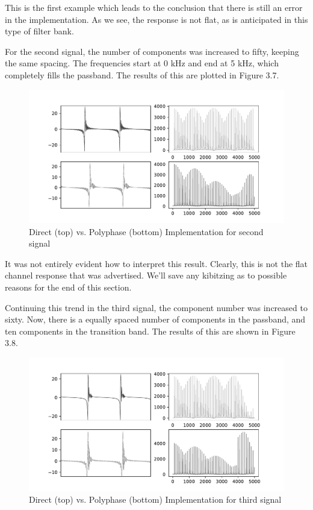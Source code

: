 \documentclass{report}
\begin{document}
This is the first example which leads to the conclusion that there is still an error in the implementation.  As we see, the response is not flat, as is anticipated in this type of filter bank.  

For the second signal, the number of components was increased to fifty, keeping the same spacing.  The frequencies start at 0 kHz and end at 5 kHz, which completely fills the passband.  The results of this are plotted in Figure 3.7.

\begin{figure}[ht]
\includegraphics[scale=.55]{Figure_7.pdf}
\caption{Direct (top) vs. Polyphase (bottom) Implementation for second signal}
\end{figure} 

It was not entirely evident how to interpret this result.  Clearly, this is not the flat channel response that was advertised.  We'll save any kibitzing as to possible reasons for the end of this section.

Continuing this trend in the third signal, the component number was increased to sixty.  Now, there is a equally spaced number of components in the passband, and ten components in the transition band. The results of this are shown in Figure 3.8.

\begin{figure}[!ht]
\includegraphics[scale=.55]{Figure_8.pdf}
\caption{Direct (top) vs. Polyphase (bottom) Implementation for third signal}
\end{figure} 
\end{document}
